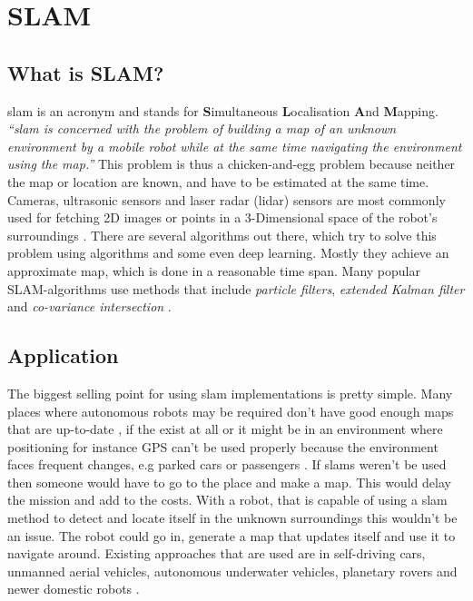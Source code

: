 
\chapter{SLAM\authorA}

\section{What is SLAM?}
\gls{slam} is an acronym and stands for \textbf{S}imultaneous \textbf{L}ocalisation \textbf{A}nd \textbf{M}apping.
\emph{\enquote{\gls{slam} is concerned with the problem of building a map of an unknown environment by a mobile robot while at the same time navigating the environment using the map.}} \cite{slamfordummies} \newline
This problem is thus a chicken-and-egg problem because neither the map or location are known, and have to be estimated at the same time. Cameras, ultrasonic sensors and laser radar (\gls{lidar}) sensors are most commonly used for fetching 2D images or points in a 3-Dimensional space of the robot's surroundings \cite{arreverie}. \newline
There are several algorithms out there, which try to solve this problem using algorithms and some even deep learning. Mostly they achieve an approximate map, which is done in a reasonable time span. Many popular SLAM-algorithms use methods that include \textit{particle filters}, \textit{extended Kalman filter} and \textit{co-variance intersection}\cite{slamfordummies} \cite{1678144}. \newline

\section{Application}
The biggest selling point for using \gls{slam} implementations is pretty simple. Many places where autonomous robots may be required don't have good enough maps that are up-to-date , if the exist at all or it might be in an environment where positioning for instance GPS can't be used properly because the environment faces frequent changes, e.g parked cars or passengers \cite{techapeekslam}.  If \gls{slam}s weren't be used then someone would have to go to the place and make a map. This would delay the mission and add to the costs. \newline
With a robot, that is capable of using a \gls{slam} method to detect and locate itself in the unknown surroundings this wouldn't be an issue. The robot could go in, generate a map that updates itself and use it to navigate around. \newline
Existing approaches that are used are in self-driving cars, unmanned aerial vehicles, autonomous underwater vehicles, planetary rovers and newer domestic robots \cite{usescasesforslam}.

